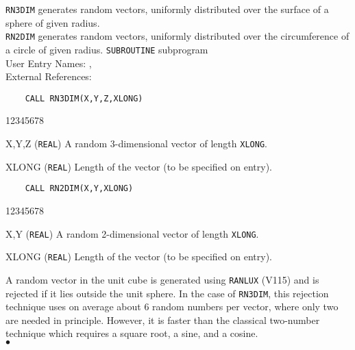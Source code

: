                              
                              
\Submitter{}                                   
{\tt RN3DIM} generates random vectors, uniformly
distributed over the surface of a sphere of given radius. \\
{\tt RN2DIM} generates random vectors, uniformly
distributed over the circumference of a circle of given radius.
\Structure
{\tt SUBROUTINE} subprogram \\
User Entry Names: ,  \\
External References: 
\Usage
\begin{verbatim}
    CALL RN3DIM(X,Y,Z,XLONG)
\end{verbatim}
\begin{DLtt}{12345678}
\item[X,Y,Z] ({\tt REAL}) A random 3-dimensional vector of length
{\tt XLONG}.
\item[XLONG] ({\tt REAL}) Length of the vector (to be specified on
entry).
\end{DLtt}
\begin{verbatim}
    CALL RN2DIM(X,Y,XLONG)
\end{verbatim}
\begin{DLtt}{12345678}
\item[X,Y] ({\tt REAL}) A random 2-dimensional vector of length
{\tt XLONG}.
\item[XLONG] ({\tt REAL}) Length of the vector (to be specified on
entry).
\end{DLtt}
\Method
A random vector in the unit cube is generated using {\tt RANLUX} (V115)
and is rejected if it lies outside the unit sphere. In the case of
{\tt RN3DIM}, this rejection
technique uses on average about 6 random numbers per vector, where only
two are needed in principle. However, it is faster than the classical
two-number technique which requires a square root, a sine, and a cosine.
\\ $\bullet$

